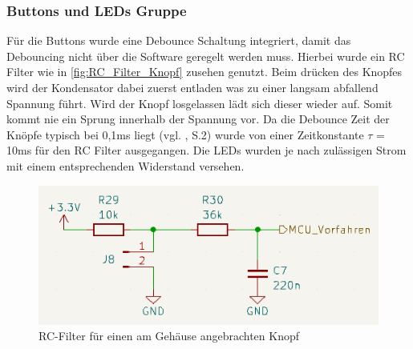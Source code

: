 \subsubsection{Buttons und LEDs Gruppe}
Für die Buttons wurde eine Debounce Schaltung integriert, damit das Debouncing nicht über die Software geregelt werden muss. Hierbei wurde ein RC Filter wie in \autoref{fig:RC_Filter_Knopf} zusehen genutzt. Beim drücken des Knopfes wird der Kondensator dabei zuerst entladen was zu einer langsam abfallend Spannung führt. Wird der Knopf losgelassen lädt sich dieser wieder auf. Somit kommt nie ein Sprung innerhalb der Spannung vor. Da die Debounce Zeit der Knöpfe typisch bei 0,1ms liegt (vgl. \cite{Schurter_Knopf}, S.2) wurde von einer Zeitkonstante $\tau$ = 10ms für den RC Filter ausgegangen. Die \ac{LED}s wurden je nach zulässigen Strom mit einem entsprechenden Widerstand versehen.
\begin{figure}[H]
	\centering
	\includegraphics[width=1.0\textwidth]{images/Hardware/RC_Filter_Knopf.PNG}
	\caption{RC-Filter für einen am Gehäuse angebrachten Knopf}
	\label{fig:RC_Filter_Knopf}
\end{figure}
